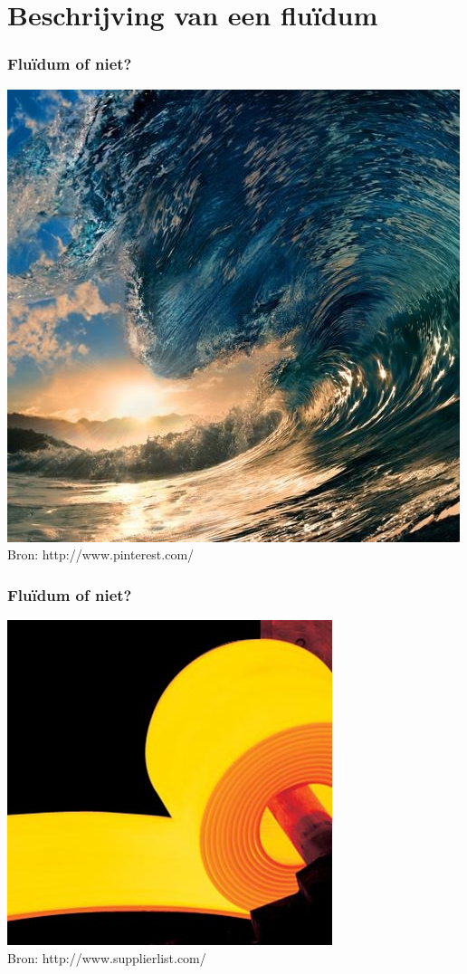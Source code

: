 \documentclass[t]{beamer}
\begin{document}
	\section{Beschrijving van een fluïdum}
		\begin{frame}
			\frametitle{Fluïdum of niet?}
			\center
    		\includegraphics[height=0.8\textheight]{../fig/basisbegrippen/golf.png}\\
			\footnotesize{Bron: http://www.pinterest.com/}
  		\end{frame}
  		\begin{frame}
  			\frametitle{Fluïdum of niet?}
			\center
    		\includegraphics[height=0.8\textheight]{../fig/basisbegrippen/staal.png}\\
			\footnotesize{Bron: http://www.supplierlist.com/}
  		\end{frame}
\end{document}
